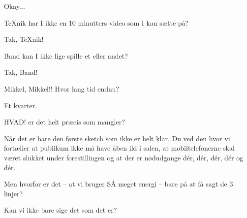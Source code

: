 \documentclass[a4paper,11pt]{article}
\begin{document}
\begin{sketch}
 Okay...


 TeXnik har I ikke en 10 minutters video som I kan sætte på?


 Tak, TeXnik!

 Band kan I ikke lige spille et eller andet?


 Tak, Band!

 Mikkel, Mikkel!! Hvor lang tid endnu?

 Et kvarter.

 HVAD! er det helt præcis som mangler?

 Når det er bare den første sketch som ikke er helt klar. Du ved den hvor vi fortæller at publikum ikke må have åben ild i salen, at mobiltelefonerne skal været slukket under forestillingen og at der er nødudgange dér, dér, dér, dér og dér.

 Men hvorfor er det -- at vi bruger SÅ meget energi -- bare på at få sagt de 3 linjer?

 Kan vi ikke bare sige det som det er?

\end{sketch}
\end{document}
